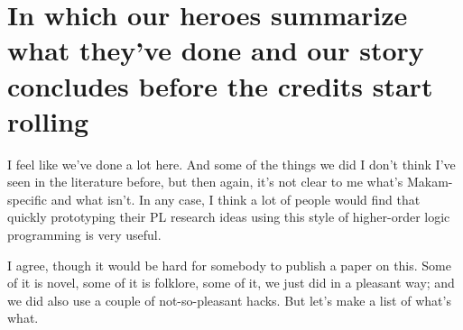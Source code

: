 \section{In which our heroes summarize what they've done and our story
concludes before the credits start
rolling}\label{in-which-our-heroes-summarize-what-theyve-done-and-our-story-concludes-before-the-credits-start-rolling}

\heroSTUDENT{} I feel like we've done a lot here. And some of the things we
did I don't think I've seen in the literature before, but then again,
it's not clear to me what's Makam-specific and what isn't. In any case,
I think a lot of people would find that quickly prototyping their PL
research ideas using this style of higher-order logic programming is
very useful.

\heroADVISOR{} I agree, though it would be hard for somebody to publish a
paper on this. Some of it is novel, some of it is folklore, some of it,
we just did in a pleasant way; and we did also use a couple of
not-so-pleasant hacks. But let's make a list of what's what.

\vspace{-0.5em}

